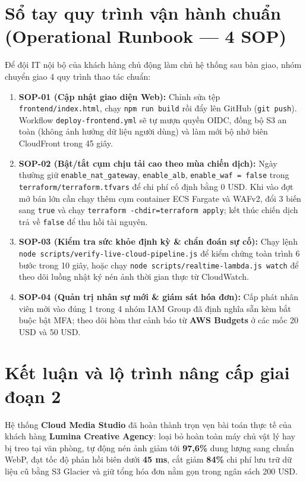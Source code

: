 \documentclass[12pt,a4paper]{report}
\begin{document}
\section{Sổ tay quy trình vận hành chuẩn (Operational Runbook --- 4 SOP)}
Để đội IT nội bộ của khách hàng chủ động làm chủ hệ thống sau bàn giao, nhóm chuyển giao 4 quy trình thao tác chuẩn:

\begin{enumerate}[leftmargin=0.7cm]
  \item \textbf{SOP-01 (Cập nhật giao diện Web):} Chỉnh sửa tệp \texttt{frontend/index.html}, chạy \texttt{npm run build} rồi đẩy lên GitHub (\texttt{git push}). Workflow \texttt{deploy-frontend.yml} sẽ tự mượn quyền OIDC, đồng bộ S3 an toàn (không ảnh hưởng dữ liệu người dùng) và làm mới bộ nhớ biên CloudFront trong 45 giây.
  \item \textbf{SOP-02 (Bật/tắt cụm chịu tải cao theo mùa chiến dịch):} Ngày thường giữ \texttt{enable\_nat\_gateway}, \texttt{enable\_alb}, \texttt{enable\_waf = false} trong \texttt{terraform/terraform.tfvars} để chi phí cố định bằng 0 USD. Khi vào đợt mở bán lớn cần chạy thêm cụm container ECS Fargate và WAFv2, đổi 3 biến sang \texttt{true} và chạy \texttt{terraform -chdir=terraform apply}; kết thúc chiến dịch trả về \texttt{false} để thu hồi tài nguyên.
  \item \textbf{SOP-03 (Kiểm tra sức khỏe định kỳ \& chẩn đoán sự cố):} Chạy lệnh \texttt{node scripts/verify-live-cloud-pipeline.js} để kiểm chứng toàn trình 6 bước trong 10 giây, hoặc chạy \texttt{node scripts/realtime-lambda.js watch} để theo dõi luồng nhật ký nén ảnh thời gian thực từ CloudWatch.
  \item \textbf{SOP-04 (Quản trị nhân sự mới \& giám sát hóa đơn):} Cấp phát nhân viên mới vào đúng 1 trong 4 nhóm IAM Group đã định nghĩa sẵn kèm bắt buộc bật MFA; theo dõi hòm thư cảnh báo từ \textbf{AWS Budgets} ở các mốc 20 USD và 50 USD.
\end{enumerate}

\section{Kết luận và lộ trình nâng cấp giai đoạn 2}
Hệ thống \textbf{Cloud Media Studio} đã hoàn thành trọn vẹn bài toán thực tế của khách hàng \textbf{Lumina Creative Agency}: loại bỏ hoàn toàn máy chủ vật lý hay bị treo tại văn phòng, tự động nén ảnh giảm tới \textbf{97,6\%} dung lượng sang chuẩn WebP, đạt tốc độ phản hồi biên dưới \textbf{45 ms}, cắt giảm \textbf{84\%} chi phí lưu trữ dữ liệu cũ bằng S3 Glacier và giữ tổng hóa đơn nằm gọn trong ngân sách 200 USD.
\end{document}
